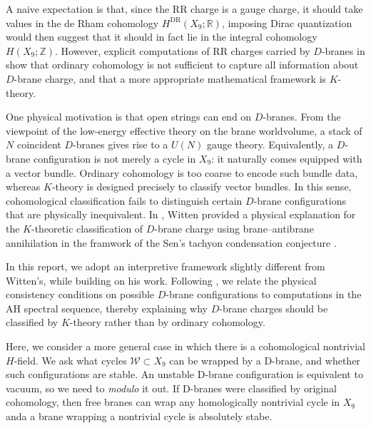 \documentclass[a4paper,11pt]{article}
\theoremstyle{definition}
\theoremstyle{remark}
\begin{document}
A naive expectation is that, since the RR charge is a gauge charge, it should take values in the de Rham cohomology $H^{\mathrm{DR}}(X_9;\mathbb{R})$, imposing Dirac quantization would then suggest that it should in fact lie in the integral cohomology $H(X_9;\mathbb{Z})$. However, explicit computations of RR charges carried by $D$-branes in \cite{Green:1996dd,Minasian:1997mm} show that ordinary cohomology is not sufficient to capture all information about $D$-brane charge, and that a more appropriate mathematical framework is $K$-theory.

One physical motivation is that open strings can end on $D$-branes. From the viewpoint of the low-energy effective theory on the brane worldvolume, a stack of $N$ coincident $D$-branes gives rise to a $U(N)$ gauge theory. Equivalently, a $D$-brane configuration is not merely a cycle in $X_9$: it naturally comes equipped with a vector bundle. Ordinary cohomology is too coarse to encode such bundle data, whereas $K$-theory is designed precisely to classify vector bundles. In this sense, cohomological classification fails to distinguish certain $D$-brane configurations that are physically inequivalent. In \cite{Witten:1998cd}, Witten provided a physical explanation for the $K$-theoretic classification of $D$-brane charge using brane–antibrane annihilation in the framwork of the Sen’s tachyon condensation conjecture \cite{Sen:1998sm}.

In this report, we adopt an interpretive framework slightly different from Witten’s, while building on his work. Following \cite{Maldacena:2001xj,Moore:2003vf}, we relate the physical consistency conditions on possible $D$-brane configurations to computations in the AH spectral sequence, thereby explaining why $D$-brane charges should be classified by $K$-theory rather than by ordinary cohomology.

Here, we consider a more general case in which there is a cohomological nontrivial $H$-field. We ask what cycles $\mathcal{W}\subset X_9$ can be wrapped by a D-brane, and whether such configurations are stable. An unstable D-brane configuration is equivalent to vacuum, so we need to {\itshape modulo} it out. If D-branes were classified by original cohomology, then free branes can wrap any homologically nontrivial cycle in $X_9$ anda a brane wrapping a nontrivial cycle is absolutely stabe. 
\end{document}

